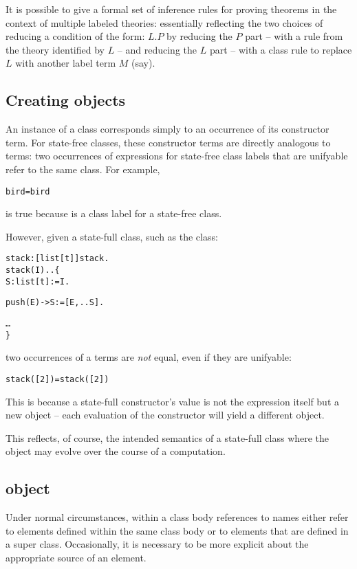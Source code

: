 It is possible to give a formal set of inference rules for proving theorems in the context of multiple labeled theories: essentially reflecting the two choices of reducing a condition of the form: $L.P$ by reducing the $P$ part -- with a rule from the theory identified by $L$ -- and reducing the $L$ part -- with a class rule to replace $L$ with another label term $M$ (say).

\subsection{Creating objects}
\label{objects:create}

An instance of a class corresponds simply to an occurrence of its constructor term. For state-free classes, these constructor terms are directly analogous to \prolog terms: two occurrences of expressions for state-free class labels that are unifyable refer to the same class. For example, 
\begin{alltt}
bird=bird
\end{alltt}
is true because  is a class label for a state-free class.

However, given a state-full class, such as the  class:
\begin{alltt}
stack:[list[t]]\sconarrow{}stack.
stack(I)..\{
  S:list[t] := I.

  push(E) -> S:=[E,..S].

  \ldots
\}
\end{alltt}
two occurrences of a  terms are \emph{not} equal, even if they are unifyable:
\begin{alltt}
\nasf{} stack([2])=stack([2])
\end{alltt}
This is because a state-full constructor's value is not the expression itself but a new object -- each evaluation of the constructor will yield a different object.

This reflects, of course, the intended semantics of a state-full class where the object may evolve over the course of a computation.

\subsection{ object}
\label{objects:this}

Under normal circumstances, within a class body references to names either refer to elements defined within the same class body or to elements that are defined in a super class. Occasionally, it is necessary to be more explicit about the appropriate source of an element.

